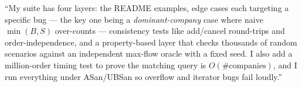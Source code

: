 \begin{say}
``My suite has four layers: the README examples, edge cases each targeting a
specific bug --- the key one being a \emph{dominant-company} case where naive
$\min(B,S)$ over-counts --- consistency tests like add/cancel round-trips and
order-independence, and a property-based layer that checks thousands of random
scenarios against an independent max-flow oracle with a fixed seed. I also add a
million-order timing test to prove the matching query is $O(\#\text{companies})$,
and I run everything under ASan/UBSan so overflow and iterator bugs fail loudly.''
\end{say}
